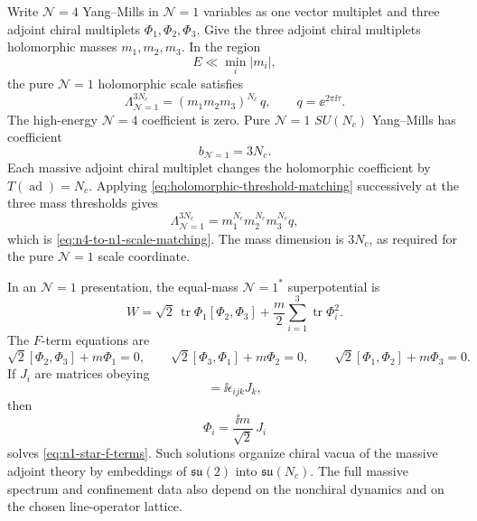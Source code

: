 Write \(\mathcal N=4\) Yang--Mills in \(\mathcal N=1\) variables as one
vector multiplet and three adjoint chiral multiplets
\(\Phi_1,\Phi_2,\Phi_3\).  Give the three adjoint chiral multiplets
holomorphic masses \(m_1,m_2,m_3\).  In the region
\[
  E\ll \min_i |m_i|,
\]
the pure \(\mathcal N=1\) holomorphic scale satisfies
\begin{equation}
  \Lambda_{\mathcal N=1}^{3N_c}
  =
  (m_1m_2m_3)^{N_c}\,q,
  \qquad
  q=\ee^{2\pi\ii\tau}.
  \label{eq:n4-to-n1-scale-matching}
\end{equation}
The high-energy \(\mathcal N=4\) coefficient is zero.  Pure
\(\mathcal N=1\) \(SU(N_c)\) Yang--Mills has coefficient
\[
  b_{\mathcal N=1}=3N_c .
\]
Each massive adjoint chiral multiplet changes the holomorphic coefficient by
\(T(\operatorname{ad})=N_c\).  Applying
\eqref{eq:holomorphic-threshold-matching} successively at the three mass
thresholds gives
\[
  \Lambda_{\mathcal N=1}^{3N_c}
  =
  m_1^{N_c}m_2^{N_c}m_3^{N_c}q,
\]
which is \eqref{eq:n4-to-n1-scale-matching}.  The mass dimension is
\(3N_c\), as required for the pure \(\mathcal N=1\) scale coordinate.

\begin{example}[\(\mathcal N=1^\ast\) chiral critical equations]
\label{ex:n1-star-critical-equations}
In an \(\mathcal N=1\) presentation, the equal-mass \(\mathcal N=1^\ast\)
superpotential is
\begin{equation}
  W
  =
  \sqrt2\,\operatorname{tr}\Phi_1[\Phi_2,\Phi_3]
  +
  \frac{m}{2}\sum_{i=1}^3\operatorname{tr}\Phi_i^2 .
  \label{eq:n1-star-superpotential}
\end{equation}
The \(F\)-term equations are
\begin{equation}
  \sqrt2[\Phi_2,\Phi_3]+m\Phi_1=0,
  \qquad
  \sqrt2[\Phi_3,\Phi_1]+m\Phi_2=0,
  \qquad
  \sqrt2[\Phi_1,\Phi_2]+m\Phi_3=0.
  \label{eq:n1-star-f-terms}
\end{equation}
If \(J_i\) are matrices obeying
\begin{equation}
  [J_i,J_j]=\ii\epsilon_{ijk}J_k,
  \label{eq:su2-fuzzy-sphere-algebra}
\end{equation}
then
\begin{equation}
  \Phi_i=\frac{\ii m}{\sqrt2}\,J_i
  \label{eq:n1-star-fuzzy-sphere-solution}
\end{equation}
solves \eqref{eq:n1-star-f-terms}.  Such solutions organize chiral vacua of
the massive adjoint theory by embeddings of \(\mathfrak{su}(2)\) into
\(\mathfrak{su}(N_c)\).  The full massive spectrum and confinement data also
depend on the nonchiral dynamics and on the chosen line-operator lattice.
\end{example}

